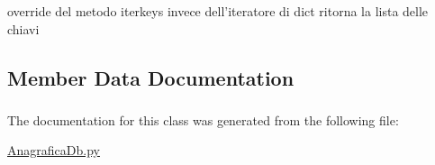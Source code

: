 \label{classmmasgis_1_1AnagraficaDb_1_1Odict_a41fa9cd0b8b83ee43c432c2b91a7070d}
\begin{DoxyVerb}
override del metodo iterkeys invece dell'iteratore di dict ritorna la lista delle chiavi
\end{DoxyVerb}
 

\subsection{Member Data Documentation}
\hypertarget{classmmasgis_1_1AnagraficaDb_1_1Odict_a4c251ec2a665ddb4b5fec6d89a4f994a}{
\subsubsection[{order}]{}}
\label{classmmasgis_1_1AnagraficaDb_1_1Odict_a4c251ec2a665ddb4b5fec6d89a4f994a}


The documentation for this class was generated from the following file:\begin{DoxyCompactItemize}
\item 
\hyperlink{AnagraficaDb_8py}{AnagraficaDb.py}\end{DoxyCompactItemize}
